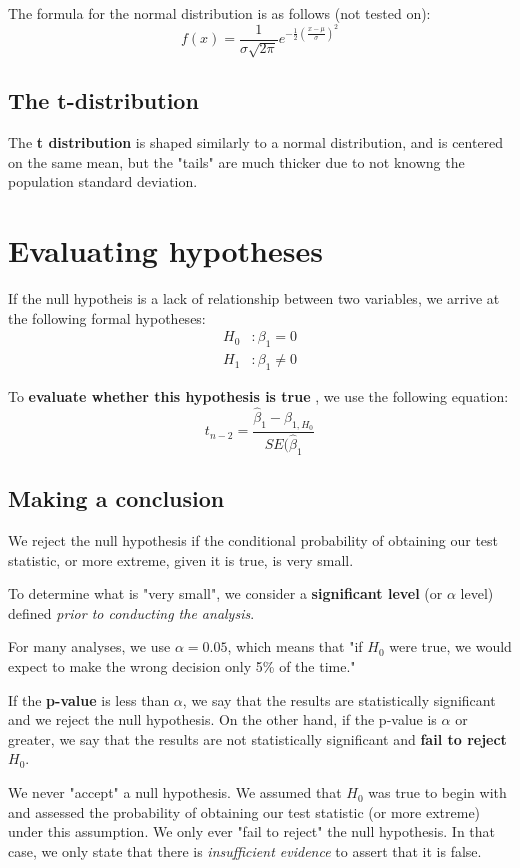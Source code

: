 \documentclass[titlepage, 12pt, leqno]{article}
\begin{document}
    The formula for the normal distribution is as follows (not tested on):
    \[
        f(x) = \frac{1}{\sigma\sqrt{2\pi }}e^{-\frac{1}{2} \left(\frac{x-\mu}{\sigma}\right)^2}
    \]
    
\subsection{The t-distribution}
The \textbf{t distribution} is shaped similarly to a normal distribution, and is centered on the same mean, but the "tails" are much thicker due to not knowng the population standard deviation.

\pagebreak
\section{Evaluating hypotheses}
If the null hypotheis is a lack of relationship between two variables, we arrive at the following formal hypotheses:
\begin{align*}
    H_0 &: \beta_1 = 0 \\
    H_1 &: \beta_1 \ne 0
\end{align*}

To \textbf{evaluate whether this hypothesis is true} , we use the following equation:
\[
    t_{n-2} = \frac{\hat{\beta}_1 - \beta_{1, H_0}}{SE(\hat{\beta}_1} 
\]
\subsection{Making a conclusion}
We reject the null hypothesis if the conditional probability of obtaining our test statistic, or more extreme, given it is true, is very small.

To determine what is "very small", we consider a \textbf{significant level} (or $\alpha$ level) defined \textit{prior to conducting the analysis}. 

For many analyses, we use $\alpha = 0.05$, which means that "if $H_0$ were true, we would expect to make the wrong decision only 5\% of the time."

If the \textbf{p-value} is less than $\alpha$, we say that the results are statistically significant and we reject the null hypothesis. On the other hand, if the p-value is $\alpha$ or greater, we say that the results are not statistically significant and \textbf{fail to reject} $H_0$.

\begin{note}
    We never "accept" a null hypothesis. We assumed that $H_0$ was true to begin with and assessed the probability of obtaining our test statistic (or more extreme) under this assumption. We only ever "fail to reject" the null hypothesis. In that case, we only state that there is \textit{insufficient evidence} to assert that it is false.
\end{note}
\end{document}
